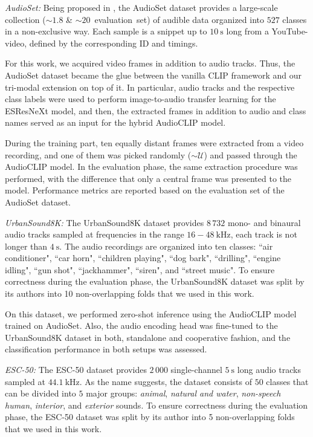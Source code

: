 \documentclass[runningheads]{llncs}
\begin{document}
\emph{AudioSet:} Being proposed in \cite{gemmeke2017audioset}, the \mbox{AudioSet} dataset provides a large-scale collection (\mbox{$\sim 1.8$\:\si{\mega}} \& \mbox{$\sim 20$\:\si{\kilo} evaluation set}) of audible data organized into $527$ classes in a non-exclusive way.
Each sample is a snippet up to $10\:\si{\second}$ long from a {YouTube}-video, defined by the corresponding ID and timings.

For this work, we acquired video frames in addition to audio tracks.
Thus, the \mbox{AudioSet} dataset became the glue between the vanilla CLIP framework and our tri-modal extension on top of it.
In particular, audio tracks and the respective class labels were used to perform image-to-audio transfer learning for the \mbox{ESResNeXt} model, and then, the extracted frames in addition to audio and class names served as an input for the hybrid \mbox{AudioCLIP} model.

During the training part, ten equally distant frames were extracted from a video recording, and one of them was picked randomly ($\sim \mathcal{U}$) and passed through the \mbox{AudioCLIP} model.
In the evaluation phase, the same extraction procedure was performed, with the difference that only a central frame was presented to the model.
Performance metrics are reported based on the evaluation set of the \mbox{AudioSet} dataset.

\emph{UrbanSound8K:} The \mbox{UrbanSound8K} dataset provides $8\,732$ mono- and binaural audio tracks sampled at frequencies in the range $16-48\:\si{\kilo \hertz}$, each track is not longer than $4\:\si{\second}$.
The audio recordings are organized into ten classes: ``air conditioner", ``car horn", ``children playing", ``dog bark", ``drilling", ``engine idling", ``gun shot", ``jackhammer", ``siren", and ``street music".
To ensure correctness during the evaluation phase, the \mbox{UrbanSound8K} dataset was split by its authors into 10 non-overlapping folds \cite{salamon2014us8k} that we used in this work.

On this dataset, we performed zero-shot inference using the \mbox{AudioCLIP} model trained on \mbox{AudioSet}.
Also, the audio encoding head was fine-tuned to the \mbox{UrbanSound8K} dataset in both, standalone and cooperative fashion, and the classification performance in both setups was assessed.

\emph{ESC-50:} The \mbox{ESC-50} dataset provides $2\,000$ single-channel $5\:\si{\second}$ long audio tracks sampled at $44.1\:\si{\kilo \hertz}$.
As the name suggests, the dataset consists of $50$ classes that can be divided into $5$ major groups: \emph{animal}, \emph{natural and water}, \emph{non-speech human}, \emph{interior}, and \emph{exterior} sounds.
To ensure correctness during the evaluation phase, the \mbox{ESC-50} dataset was split by its author into 5 non-overlapping folds \cite{piczak2015esc} that we used in this work.
\end{document}
